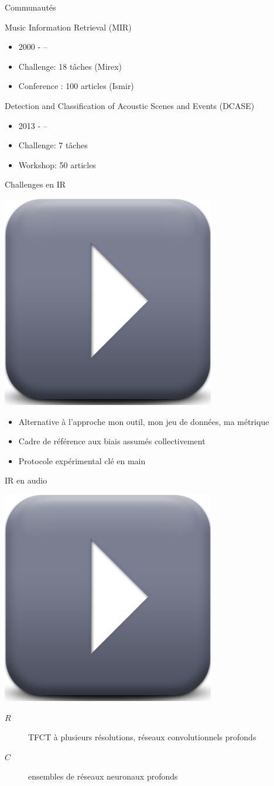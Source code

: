 \begin{frame}{Communautés}
\begin{block}{Music Information Retrieval (MIR)}
\begin{itemize}
\item 2000 - --
\item Challenge: 18 tâches  (Mirex)
\item Conference : 100 articles (Ismir)
\end{itemize}
\end{block}
\begin{block}{Detection and Classification of
Acoustic Scenes and Events (DCASE)}
\begin{itemize}
\item 2013 - --
\item Challenge: 7 tâches
\item Workshop: 50 articles
\end{itemize}
\end{block}
\end{frame}

\begin{frame}{Challenges en IR}
\begin{center}
\includegraphics[width=.3\columnwidth]{figures/play} \\ %
\end{center}
\begin{itemize}
\item Alternative à l'approche \og mon outil, mon jeu de données, ma métrique \fg
\item Cadre de référence aux biais assumés collectivement
\item Protocole expérimental \og clé en main \fg
\end{itemize}
\end{frame}

\begin{frame}{IR en audio}
\begin{center}
\includegraphics[width=.3\columnwidth]{figures/play}
\end{center}
\begin{description}
\item[$R$] TFCT à plusieurs résolutions, réseaux convolutionnels profonds
\item[$C$] ensembles de réseaux neuronaux profonds 
\end{description}
\end{frame}

